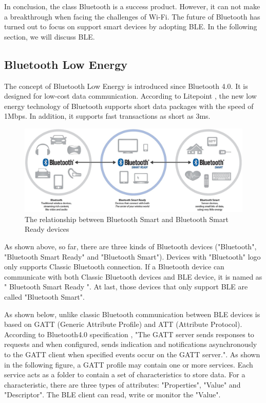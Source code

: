 \documentclass{Nan_Thesis}
\begin{document}
In conclusion, the class Bluetooth is a success product. However, it can not make a breakthrough when facing the challenges of Wi-Fi. The future of Bluetooth has turned out to focus on support smart devices by adopting BLE. In the following section, we will discuss BLE.
\subsection{Bluetooth Low Energy}
The concept of Bluetooth Low Energy is introduced since Bluetooth 4.0. It is designed for low-cost data communication. According to Litepoint \cite{BLE2014litepoint}, the new low energy technology of Bluetooth supports short data packages with the speed of 1Mbps. In addition, it supports fast transactions as short as 3ms. 


\begin{figure}[h]
  \centering 
      \includegraphics[scale=0.4]{pic/bluetoothproductsrelationship.png} 
  \caption{The relationship between Bluetooth Smart and Bluetooth Smart Ready devices \cite{torvmark2013threeflavourofbluetooth}}
\end{figure} 

As shown above, so far, there are three kinds of Bluetooth devices ("Bluetooth", "Bluetooth Smart Ready" and "Bluetooth Smart"). Devices with "Bluetooth" logo only supports Classic Bluetooth connection. If a Bluetooth device can communicate with both Classic Bluetooth devices and BLE device, it is named as " Bluetooth Smart Ready ". At last, those devices that only support BLE are called "Bluetooth Smart". 

As shown below, unlike classic Bluetooth communication between BLE devices is based on GATT (Generic Attribute Profile) and ATT (Attribute Protocol). According to Bluetooth4.0 specification \cite{bluetooth2010bluetooth}, "The GATT server sends responses to requests and when configured, sends indication and notifications asynchronously to the GATT client when specified events occur on the GATT server.". As shown in the following figure, a GATT profile may contain one or more services. Each service acts as a folder to contain a set of characteristics to store data. For a characteristic, there are three types of attributes: "Properties", "Value" and "Descriptor". The BLE client can read, write or monitor the "Value". 
\end{document}
